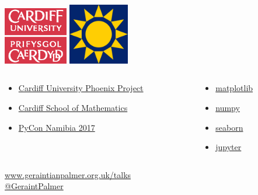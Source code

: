 \documentclass{beamer}
\begin{document}
\begin{frame}{{}}
\begin{center}
\includegraphics[width=0.21\textwidth]{cflogo}
\hspace{10mm}
\includegraphics[width=0.2\textwidth]{napycon_logo}
\vspace{5mm}
\begin{columns}
\begin{column}{0.7\textwidth}
\begin{itemize}
\item \href{http://www.cardiff.ac.uk/about/our-profile/our-values/engagement/transforming-communities/the-phoenix-project}{Cardiff University Phoenix Project}
\item \href{http://www.cardiff.ac.uk/mathematics}{Cardiff School of Mathematics}
\item \href{https://na.pycon.org/}{PyCon Namibia 2017}
\end{itemize}
\end{column}
\begin{column}{0.3\textwidth}
\begin{itemize}
\item \href{http://matplotlib.org/}{matplotlib}
\item \href{http://www.numpy.org/}{numpy}
\item \href{http://seaborn.pydata.org/}{seaborn}
\item \href{http://jupyter.org/}{jupyter}
\end{itemize}
\end{column}
\end{columns}
\vspace{5mm}
\textcolor{orange}{
\url{www.geraintianpalmer.org.uk/talks}\\
\href{https://twitter.com/GeraintPalmer}{@GeraintPalmer}
}
\end{center}
\end{frame}
\end{document}
